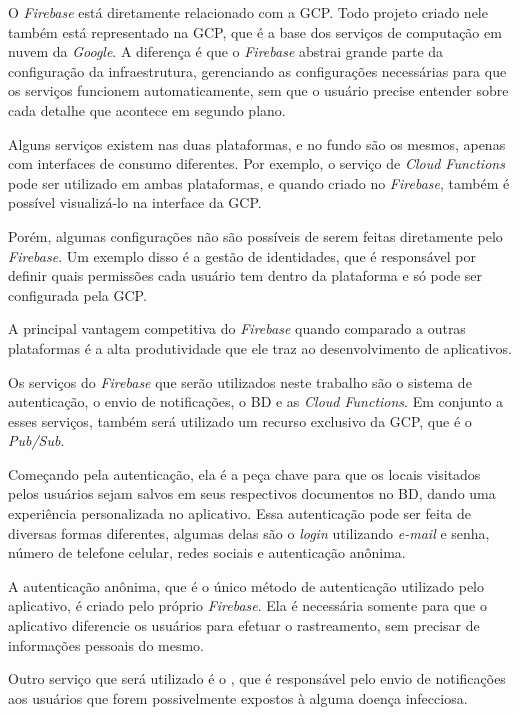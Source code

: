O \textit{Firebase} está diretamente relacionado com a GCP. Todo projeto criado nele também está representado na GCP, que é a base dos serviços de computação em nuvem da \textit{Google}. A diferença é que o \textit{Firebase} abstrai grande parte da configuração da infraestrutura, gerenciando as configurações necessárias para que os serviços funcionem automaticamente, sem que o usuário precise entender sobre cada detalhe que acontece em segundo plano.

Alguns serviços existem nas duas plataformas, e no fundo são os mesmos, apenas com interfaces de consumo diferentes. Por exemplo, o serviço de \textit{Cloud Functions} pode ser utilizado em ambas plataformas, e quando criado no \textit{Firebase}, também é possível visualizá-lo na interface da GCP.

Porém, algumas configurações não são possíveis de serem feitas diretamente pelo \textit{Firebase}. Um exemplo disso é a gestão de identidades, que é responsável por definir quais permissões cada usuário tem dentro da plataforma e só pode ser configurada pela GCP.

A principal vantagem competitiva do \textit{Firebase} quando comparado a outras plataformas é a alta produtividade que ele traz ao desenvolvimento de aplicativos.

Os serviços do \textit{Firebase} que serão utilizados neste trabalho são o sistema de autenticação, o envio de notificações, o BD e as \textit{Cloud Functions}. Em conjunto a esses serviços, também será utilizado um recurso exclusivo da GCP, que é o \textit{Pub/Sub}.

Começando pela autenticação, ela é a peça chave para que os locais visitados pelos usuários sejam salvos em seus respectivos documentos no BD, dando uma experiência personalizada no aplicativo. Essa autenticação pode ser feita de diversas formas diferentes, algumas delas são o \textit{login} utilizando \textit{e-mail} e senha, número de telefone celular, redes sociais e autenticação anônima.

A autenticação anônima, que é o único método de autenticação utilizado pelo aplicativo, é criado pelo próprio \textit{Firebase}. Ela é necessária somente para que o aplicativo diferencie os usuários para efetuar o rastreamento, sem precisar de informações pessoais do mesmo.

Outro serviço que será utilizado é o , que é responsável pelo envio de notificações aos usuários que forem possivelmente expostos à alguma doença infecciosa.

